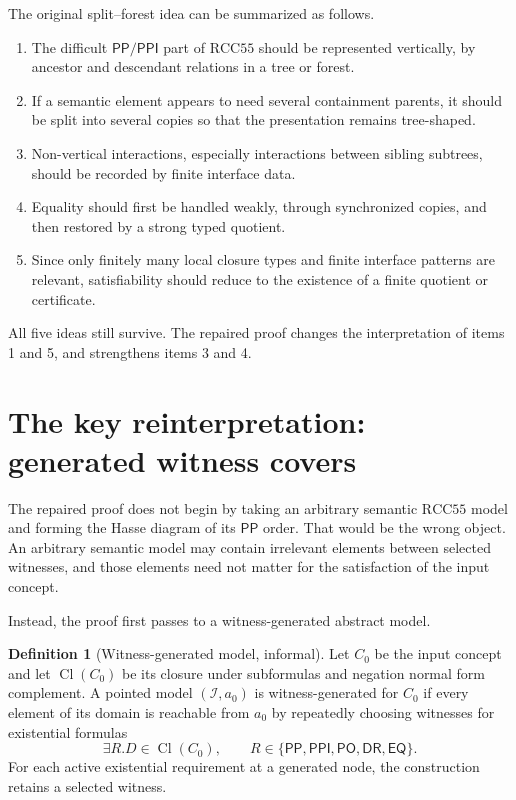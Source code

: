 \documentclass[11pt]{article}
\newcommand{\RCC}{\mathrm{RCC5}}
\newcommand{\PP}{\mathsf{PP}}
\newcommand{\PPI}{\mathsf{PPI}}
\newcommand{\PO}{\mathsf{PO}}
\newcommand{\DR}{\mathsf{DR}}
\newcommand{\EQ}{\mathsf{EQ}}
\newcommand{\Cl}{\operatorname{Cl}}
\theoremstyle{definition}
\newtheorem{definition}{Definition}
\theoremstyle{plain}
\begin{document}
The original split--forest idea can be summarized as follows.

\begin{enumerate}[leftmargin=2em]
\item The difficult $\PP/\PPI$ part of $\RCC5$ should be represented vertically, by ancestor and descendant relations in a tree or forest.
\item If a semantic element appears to need several containment parents, it should be split into several copies so that the presentation remains tree-shaped.
\item Non-vertical interactions, especially interactions between sibling subtrees, should be recorded by finite interface data.
\item Equality should first be handled weakly, through synchronized copies, and then restored by a strong typed quotient.
\item Since only finitely many local closure types and finite interface patterns are relevant, satisfiability should reduce to the existence of a finite quotient or certificate.
\end{enumerate}

All five ideas still survive.  The repaired proof changes the interpretation of items 1 and 5, and strengthens items 3 and 4.

\section{The key reinterpretation: generated witness covers}

The repaired proof does not begin by taking an arbitrary semantic $\RCC5$ model and forming the Hasse diagram of its $\PP$ order.  That would be the wrong object.  An arbitrary semantic model may contain irrelevant elements between selected witnesses, and those elements need not matter for the satisfaction of the input concept.

Instead, the proof first passes to a witness-generated abstract model.

\begin{definition}[Witness-generated model, informal]
Let $C_0$ be the input concept and let $\Cl(C_0)$ be its closure under subformulas and negation normal form complement.  A pointed model $(\mathcal I,a_0)$ is witness-generated for $C_0$ if every element of its domain is reachable from $a_0$ by repeatedly choosing witnesses for existential formulas
\[
\exists R.D\in\Cl(C_0),
\qquad R\in\{\PP,\PPI,\PO,\DR,\EQ\}.
\]
For each active existential requirement at a generated node, the construction retains a selected witness.
\end{definition}
\end{document}
